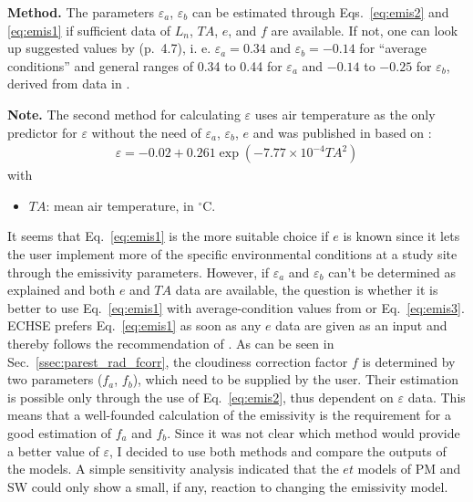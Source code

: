 \documentclass{scrreprt}
\newenvironment{denseitem}{
  \begin{itemize}
    \setlength{\itemsep}{0pt}
    \setlength{\parskip}{0pt}
    \setlength{\parsep}{0pt}
}{
  \end{itemize}
}
\begin{document}
\textbf{Method.}
The parameters $\varepsilon_a$, $\varepsilon_b$ can be estimated through Eqs.~\eqref{eq:emis2} and \eqref{eq:emis1} if sufficient data of $L_n$, $TA$, $e$, and $f$ are available.
If not, one can look up suggested values by \citet{maidment93} (p.~4.7), i. e. $\varepsilon_a = 0.34$ and $\varepsilon_b = -0.14$ for ``average conditions'' and general ranges of 0.34 to 0.44 for $\varepsilon_a$ and $-0.14$ to $-0.25$ for $\varepsilon_b$, derived from data in \citet{fao77}.

\textbf{Note.}
The second method for calculating $\varepsilon$ uses air temperature as the only predictor for $\varepsilon$ without the need of $\varepsilon_a$, $\varepsilon_b$, $e$ and was published in \citet{maidment93} based on \citet{idso69}:
\begin{align} \label{eq:emis3}
  \varepsilon = -0.02 + 0.261 \exp(-7.77 \times 10^{-4} TA^2)
\end{align}
%
with
\begin{denseitem}
  \item[] $TA$: mean air temperature, in $^\circ$C.
\end{denseitem}
%
It seems that Eq.~\eqref{eq:emis1} is the more suitable choice if $e$ is known since it lets the user implement more of the specific environmental conditions at a study site through the emissivity parameters.
However, if $\varepsilon_a$ and $\varepsilon_b$ can't be determined as explained and both $e$ and $TA$ data are available, the question is whether it is better to use Eq.~\eqref{eq:emis1} with average-condition values from \citet{maidment93} or Eq.~\eqref{eq:emis3}.
ECHSE prefers Eq.~\eqref{eq:emis1} as soon as any $e$ data are given as an input and thereby follows the recommendation of \citet{maidment93}.
As can be seen in Sec.~\ref{ssec:parest_rad_fcorr}, the cloudiness correction factor $f$ is determined by two parameters ($f_a$, $f_b$), which need to be supplied by the user.
Their estimation is possible only through the use of Eq.~\eqref{eq:emis2}, thus dependent on $\varepsilon$ data.
This means that a well-founded calculation of the emissivity is the requirement for a good estimation of $f_a$ and $f_b$.
Since it was not clear which method would provide a better value of $\varepsilon$, I decided to use both methods and compare the outputs of the models.
A simple sensitivity analysis indicated that the $et$ models of PM and SW could only show a small, if any, reaction to changing the emissivity model.
\end{document}

